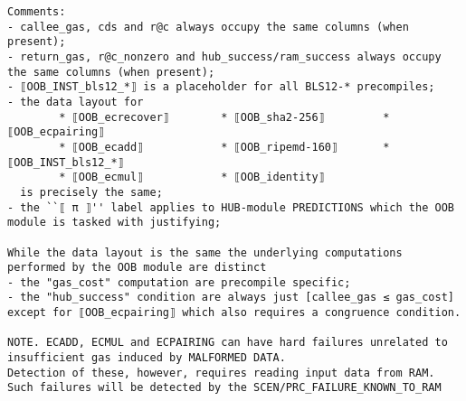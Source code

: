 \documentclass[varwidth=\maxdimen,margin=0.5cm,multi={verbatim}]{standalone}
\begin{document}
\begin{verbatim}
Comments: 
- callee_gas, cds and r@c always occupy the same columns (when present);
- return_gas, r@c_nonzero and hub_success/ram_success always occupy the same columns (when present);
- ⟦OOB_INST_bls12_*⟧ is a placeholder for all BLS12-* precompiles;
- the data layout for
        * ⟦OOB_ecrecover⟧        * ⟦OOB_sha2-256⟧         * ⟦OOB_ecpairing⟧
        * ⟦OOB_ecadd⟧            * ⟦OOB_ripemd-160⟧       * ⟦OOB_INST_bls12_*⟧              
        * ⟦OOB_ecmul⟧            * ⟦OOB_identity⟧
  is precisely the same;
- the ``⟦ π ⟧'' label applies to HUB-module PREDICTIONS which the OOB module is tasked with justifying;

While the data layout is the same the underlying computations performed by the OOB module are distinct
- the "gas_cost" computation are precompile specific;
- the "hub_success" condition are always just [callee_gas ≤ gas_cost] except for ⟦OOB_ecpairing⟧ which also requires a congruence condition.

NOTE. ECADD, ECMUL and ECPAIRING can have hard failures unrelated to insufficient gas induced by MALFORMED DATA.
Detection of these, however, requires reading input data from RAM. Such failures will be detected by the SCEN/PRC_FAILURE_KNOWN_TO_RAM 
\end{verbatim}
\end{document}
